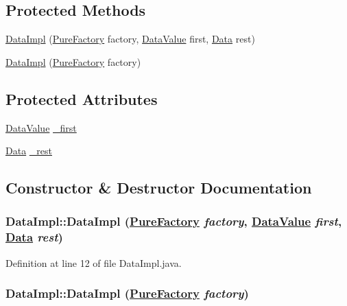 \subsection*{Protected Methods}
\begin{CompactItemize}
\item 
\hyperlink{classDataImpl_b0}{Data\-Impl} (\hyperlink{classPureFactory}{Pure\-Factory} factory, \hyperlink{interfaceDataValue}{Data\-Value} first, \hyperlink{interfaceData}{Data} rest)
\item 
\hyperlink{classDataImpl_b1}{Data\-Impl} (\hyperlink{classPureFactory}{Pure\-Factory} factory)
\end{CompactItemize}
\subsection*{Protected Attributes}
\begin{CompactItemize}
\item 
\hyperlink{interfaceDataValue}{Data\-Value} \hyperlink{classDataImpl_n0}{\_\-first}
\item 
\hyperlink{interfaceData}{Data} \hyperlink{classDataImpl_n1}{\_\-rest}
\end{CompactItemize}


\subsection{Constructor \& Destructor Documentation}
\hypertarget{classDataImpl_b0}{
\subsubsection[DataImpl]{\setlength{\rightskip}{0pt plus 5cm}Data\-Impl::Data\-Impl (\hyperlink{classPureFactory}{Pure\-Factory} {\em factory}, \hyperlink{interfaceDataValue}{Data\-Value} {\em first}, \hyperlink{interfaceData}{Data} {\em rest})}}
\label{classDataImpl_b0}




Definition at line 12 of file Data\-Impl.java.\hypertarget{classDataImpl_b1}{
\subsubsection[DataImpl]{\setlength{\rightskip}{0pt plus 5cm}Data\-Impl::Data\-Impl (\hyperlink{classPureFactory}{Pure\-Factory} {\em factory})}}
\label{classDataImpl_b1}




